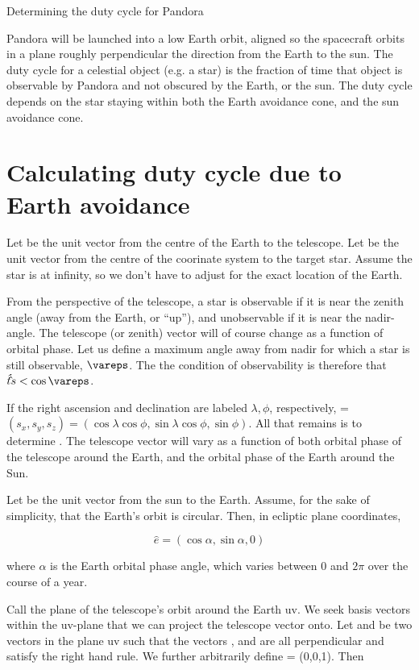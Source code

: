 
Determining the duty cycle for Pandora

Pandora will be launched into a low Earth orbit, aligned so the spacecraft orbits in a plane roughly perpendicular the direction from the Earth to the sun. The duty cycle for a celestial object (e.g. a star) is the fraction of time that object is observable by Pandora and not obscured by the Earth, or the sun. The duty cycle depends on the star staying within both the Earth avoidance cone, and the sun avoidance cone.


\section{Calculating duty cycle due to Earth avoidance}
Let  be the unit vector from the centre of the Earth to the telescope.
Let  be the unit vector from the centre of the coorinate system to the target star. Assume the star is at infinity, so we don't have to adjust  for the exact location of the Earth.

From the perspective of the telescope, a star is observable if it is near the zenith angle (away from the Earth, or ``up''), and unobservable if it is near the nadir-angle. The telescope (or zenith) vector will of course change as a function of orbital phase.  Let us define a maximum angle away from nadir for which a star is still observable, $\vareps$. The the condition of observability is therefore that $\hat{t} \dot \hat{s} < \cos{\vareps}$.

If the right ascension and declination are labeled $\lambda, \phi$, respectively,  = $ (s_x, s_y, s_z) = (\cos{\lambda} \cos{\phi}, \sin{\lambda} \cos{\phi}, \sin{\phi})$. All that remains is to determine . The telescope vector will vary as a function of both orbital phase of the telescope around the Earth, and the orbital phase of the Earth around the Sun.



Let  be the unit vector from the sun to the Earth. Assume, for the sake of simplicity, that the Earth's orbit is circular. Then, in ecliptic plane coordinates, 

\begin{equation}
\hat{e} = ( \cos{\alpha}, \sin{\alpha}, 0)
\end{equation}

where $\alpha$ is the Earth orbital phase angle, which varies between 0 and $2\pi$ over the course of a year.

Call the plane of the telescope's orbit around the Earth uv. We seek basis vectors within the uv-plane that we can project the telescope vector onto.
Let  and  be two vectors in the plane uv such that the vectors ,  and  are all perpendicular and satisfy the right hand rule. We further arbitrarily define  = (0,0,1). Then

